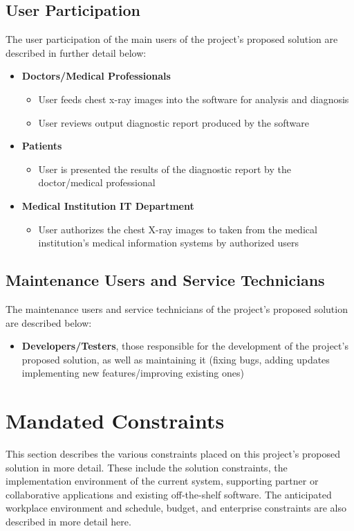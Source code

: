 \documentclass[12pt]{article}
\begin{document}
\subsection{User Participation}
The user participation of the main users of the project’s proposed solution are described in further detail below:
\begin{itemize}
    \item \textbf{Doctors/Medical Professionals}
    \begin{itemize}
        \item User feeds chest x-ray images into the software for analysis and diagnosis
        \item User reviews output diagnostic report produced by the software 
    \end{itemize} 
    \item \textbf{Patients}
    \begin{itemize}
        \item User is presented the results of the diagnostic report by the doctor/medical professional
    \end{itemize}
    \item \textbf{Medical Institution IT Department}
    \begin{itemize}
        \item User authorizes the chest X-ray images to taken from the medical institution’s medical information systems by authorized users
    \end{itemize}
\end{itemize}

\subsection{Maintenance Users and Service Technicians}
The maintenance users and service technicians of the project’s proposed solution are described below:
\begin{itemize}
    \item \textbf{Developers/Testers}, those responsible for the development of the project’s proposed solution, as well as maintaining it (fixing bugs, adding updates implementing new features/improving existing ones) 
\end{itemize}

\section{Mandated Constraints}
This section describes the various constraints placed on this project's proposed solution in more detail. These include the solution constraints, the implementation environment of the current system, supporting partner or collaborative applications and existing off-the-shelf software. The anticipated workplace environment and schedule, budget, and enterprise constraints are also described in more detail here.
\end{document}
